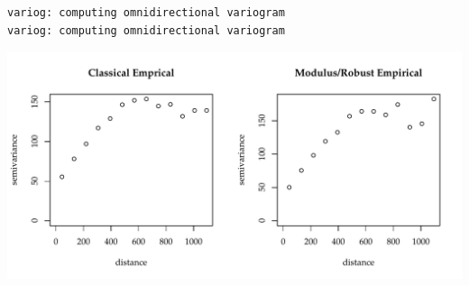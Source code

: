 \documentclass{article}\usepackage[]{graphicx}\usepackage[]{color}
\makeatletter
\def\maxwidth{ %
  \ifdim\Gin@nat@width>\linewidth
    \linewidth
  \else
    \Gin@nat@width
  \fi
}
\newenvironment{kframe}{%
 \def\at@end@of@kframe{}%
 \ifinner\ifhmode%
  \def\at@end@of@kframe{\end{minipage}}%
  \begin{minipage}{\columnwidth}%
 \fi\fi%
 \def\FrameCommand##1{\hskip\@totalleftmargin \hskip-\fboxsep
 \colorbox{shadecolor}{##1}\hskip-\fboxsep
     \hskip-\linewidth \hskip-\@totalleftmargin \hskip\columnwidth}%
 \MakeFramed {\advance\hsize-\width
   \@totalleftmargin\z@ \linewidth\hsize
   \@setminipage}}%
 {\par\unskip\endMakeFramed%
 \at@end@of@kframe}
\newenvironment{knitrout}{}{} %
\makeatother
\begin{document}
\begin{knitrout}\footnotesize
{}\color{fgcolor}\begin{kframe}
\begin{verbatim}
variog: computing omnidirectional variogram
variog: computing omnidirectional variogram
\end{verbatim}
\end{kframe}

{\centering \includegraphics[width=\maxwidth]{figure/emp_var-1} 

}



\end{knitrout}
\end{document}
